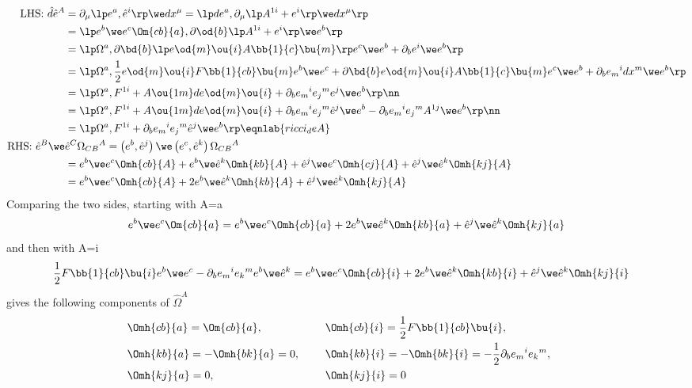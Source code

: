 \begin{align}
\mbox{LHS: }\hat d \hat e^A &= \partial_\mu\lp e^a,\hat e^i\rp\we dx^\mu = \lp de^a,\partial_\mu\lp A^{1i} + e^i\rp\we dx^\mu\rp\nonumber\\
& = \lp e^b\we e^c \Om{cb}{a},\partial\od{b}\lp A^{1i} + e^i\rp\we e^b\rp \nonumber\\ 
& = \lp \Omega^a,\partial\bd{b}\lp e\od{m}\ou{i}A\bb{1}{c}\bu{m}\rp e^c\we e^b + \partial_be^i\we e^b \rp\nonumber\\  
& = \lp \Omega^a,\frac{1}{2}e\od{m}\ou{i}F\bb{1}{cb}\bu{m}e^b\we e^c + \partial\bd{b}e\od{m}\ou{i}A\bb{1}{c}\bu{m} e^c\we e^b + \partial_be{_m}^idx^m\we e^b \rp \nonumber\\  
& = \lp \Omega^a,F^{1i} + A\ou{1m}de\od{m}\ou{i} + \partial_be{_m}^i e{_j}^m e^j\we e^b \rp\nn\\
& = \lp \Omega^a,F^{1i} + A\ou{1m}de\od{m}\ou{i} + \partial_be{_m}^i e{_j}^m \hat e^j\we e^b - \partial_be{_m}^i e{_j}^m A^{1j}\we e^b \rp\nn\\
& = \lp \Omega^a,F^{1i} + \partial_be{_m}^i e{_j}^m \hat e^j\we e^b\rp
\eqnlab{ricci_deA}
\\
\mbox{RHS: }\hat e^B\we&\hat e^C \Omega{_{CB}}^A = \left(e^b,\hat e^j\right)\we\left(e^c,\hat e^k\right)\Omega{_{CB}}^A\nonumber\\
& = e^b\we e^c\Omh{cb}{A} + e^b\we\hat e^k\Omh{kb}{A} + \hat e^j\we e^c\Omh{cj}{A} + \hat e^j\we\hat e^k\Omh{kj}{A}\nonumber\\
& = e^b\we e^c\Omh{cb}{A} + 2e^b\we\hat e^k\Omh{kb}{A} + \hat e^j\we\hat e^k\Omh{kj}{A}
\end{align}
Comparing the two sides, starting with A=a
\begin{align}
e^b\we e^c \Om{cb}{a} = e^b\we e^c\Omh{cb}{a} + 2e^b\we\hat e^k\Omh{kb}{a} + \hat e^j\we\hat e^k\Omh{kj}{a}
\end{align}
and then with A=i
\begin{align}
\frac{1}{2}F\bb{1}{cb}\bu{i}e^b\we e^c & - \partial_be{_m}^i e{_k}^m e^b\we\hat e^k = e^b\we e^c\Omh{cb}{i} + 2e^b\we\hat e^k\Omh{kb}{i} + \hat e^j\we\hat e^k\Omh{kj}{i}
\end{align}
gives the following components of $\hat\Omega^A$
\begin{align}
&\Omh{cb}{a}=\Om{cb}{a},\hspace{0.5cm}
&&\Omh{cb}{i}=\frac{1}{2}F\bb{1}{cb}\bu{i},\hspace{0.5cm}\nonumber\\
&\Omh{kb}{a}=-\Omh{bk}{a}=0,\hspace{0.5cm}
&&\Omh{kb}{i}=-\Omh{bk}{i}=-\frac{1}{2}\partial_be{_m}^i e{_k}^m,\hspace{0.5cm}\nonumber\\
&\Omh{kj}{a}=0,
&&\Omh{kj}{i}=0
\end{align}
